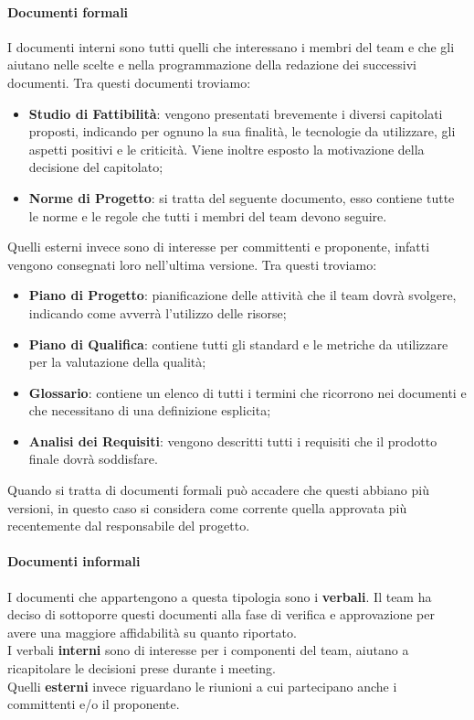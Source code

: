 \paragraph{Documenti formali}
I documenti interni sono tutti quelli che interessano i membri del team e che gli aiutano nelle scelte e nella programmazione della redazione dei successivi documenti.
Tra questi documenti troviamo:
\begin{itemize}
    \item\textbf{Studio di Fattibilità}: vengono presentati brevemente i diversi capitolati proposti, indicando per ognuno la sua finalità, le tecnologie da utilizzare, gli aspetti positivi e le criticità. Viene inoltre esposto la motivazione della decisione del capitolato;
    \item\textbf{Norme di Progetto}: si tratta del seguente documento, esso contiene tutte le norme e le regole che tutti i membri del team devono seguire.
\end{itemize}
Quelli esterni invece sono di interesse per committenti e proponente, infatti vengono consegnati loro nell'ultima versione.
Tra questi troviamo:
\begin{itemize}
    \item\textbf{Piano di Progetto}: pianificazione delle attività che il team dovrà svolgere, indicando come avverrà l'utilizzo delle risorse;
    \item\textbf{Piano di Qualifica}: contiene tutti gli standard e le metriche da utilizzare per la valutazione della qualità;
    \item\textbf{Glossario}: contiene un elenco di tutti i termini che ricorrono nei documenti e che necessitano di una definizione esplicita;
    \item\textbf{Analisi dei Requisiti}: vengono descritti tutti i requisiti che il prodotto finale dovrà soddisfare.
\end{itemize}
Quando si tratta di documenti formali può accadere che questi abbiano più versioni, in questo caso si considera come corrente quella approvata più recentemente dal responsabile del progetto.

\paragraph{Documenti informali}
I documenti che appartengono a questa tipologia sono i \textbf{verbali}.
Il team ha deciso di sottoporre questi documenti alla fase di verifica e approvazione per avere una maggiore affidabilità su quanto riportato.\\
I verbali \textbf{interni} sono di interesse per i componenti del team, aiutano a ricapitolare le decisioni prese durante i meeting.\\
Quelli \textbf{esterni} invece riguardano le riunioni a cui partecipano anche i committenti e/o il proponente.

